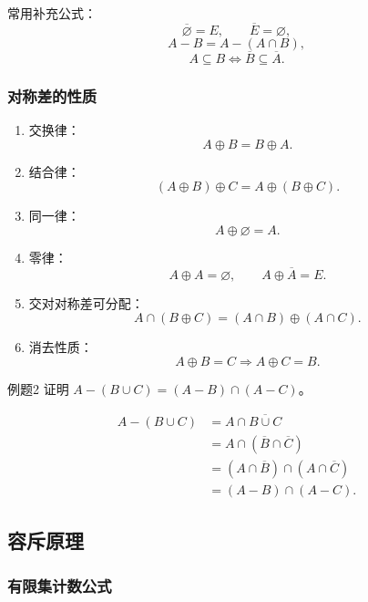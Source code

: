常用补充公式：
\[
\overline{\varnothing}=E,\qquad \overline{E}=\varnothing,
\]
\[
A-B=A-(A\cap B),
\]
\[
A\subseteq B\Leftrightarrow \overline{B}\subseteq\overline{A}.
\]

\subsubsection{对称差的性质}

\begin{enumerate}
	\item 交换律：
	\[
	A\oplus B=B\oplus A.
	\]
	\item 结合律：
	\[
	(A\oplus B)\oplus C=A\oplus(B\oplus C).
	\]
	\item 同一律：
	\[
	A\oplus\varnothing=A.
	\]
	\item 零律：
	\[
	A\oplus A=\varnothing,\qquad A\oplus\overline{A}=E.
	\]
	\item 交对对称差可分配：
	\[
	A\cap(B\oplus C)=(A\cap B)\oplus(A\cap C).
	\]
	\item 消去性质：
	\[
	A\oplus B=C\Rightarrow A\oplus C=B.
	\]
\end{enumerate}

\begin{question}{例题2}
	证明 \(A-(B\cup C)=(A-B)\cap(A-C)\)。
	
	\begin{solution}
	\begin{align*}
	A-(B\cup C)
	&=A\cap\overline{B\cup C}\\
	&=A\cap(\overline{B}\cap\overline{C})\\
	&=(A\cap\overline{B})\cap(A\cap\overline{C})\\
	&=(A-B)\cap(A-C).
	\end{align*}
	\end{solution}
\end{question}

\subsection{容斥原理}

\subsubsection{有限集计数公式}

